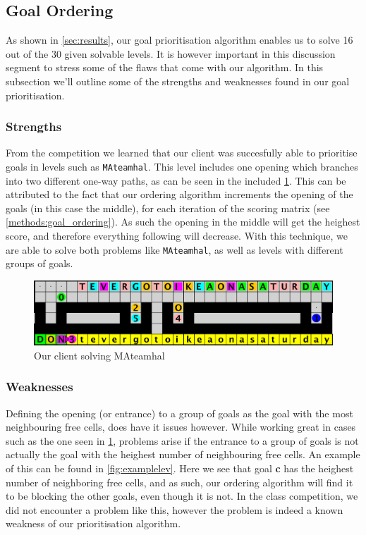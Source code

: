 \subsection{Goal Ordering}
\label{subsec:disc_goal_ordering}

As shown in \cref{sec:results}, our goal prioritisation algorithm enables us to solve 16 out of the 30 given solvable levels.
It is however important in this discussion segment to stress some of the flaws that come with our algorithm.
In this subsection we'll outline some of the strengths and weaknesses found in our goal prioritisation.

\subsubsection{Strengths} From the competition we learned that our client was succesfully able to prioritise goals in levels such as \texttt{MAteamhal}.
This level includes one opening which branches into two different one-way paths, as can be seen in the included \cref{fig:mateamhal}.
This can be attributed to the fact that our ordering algorithm increments the opening of the goals (in this case the middle), for each iteration of the scoring matrix (see \cref{methods:goal_ordering}).
As such the opening in the middle will get the heighest score, and therefore everything following will decrease.
With this technique, we are able to solve both problems like \texttt{MAteamhal}, as well as levels with different groups of goals.

\begin{figure}[h!]
  \centering
  \includegraphics[width=.95\columnwidth]{graphics/mateahhal.png}
  \caption{\label{fig:mateamhal}Our client solving MAteamhal}
\end{figure}

\subsubsection{Weaknesses} Defining the opening (or entrance) to a group of goals as the goal with the most neighbouring free cells, does have it issues however.
While working great in cases such as the one seen in \cref{fig:mateamhal}, problems arise if the entrance to a group of goals is not actually the goal with the heighest number of neighbouring free cells.
An example of this can be found in \cref{fig:examplelev}.
Here we see that goal \textbf{c} has the heighest number of neighboring free cells, and as such, our ordering algorithm will find it to be blocking the other goals, even though it is not.
In the class competition, we did not encounter a problem like this, however the problem is indeed a known weakness of our prioritisation algorithm.

